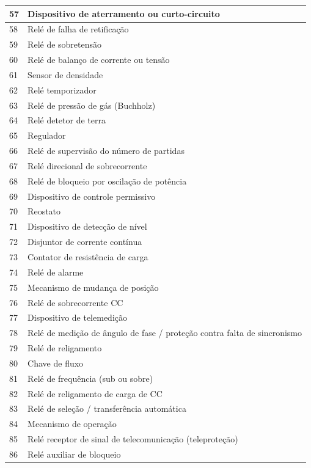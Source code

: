 \documentclass[a5paper,english,spanish,brazil]{ufsc-thesis}
\begin{document}
\begin{longtable}{|l|p{}|}
  57 & Dispositivo de aterramento ou curto-circuito \\ \hline
  58 & Relé de falha de retificação \\ \hline
  59 & Relé de sobretensão \\ \hline
  60 & Relé de balanço de corrente ou tensão \\ \hline
  61 & Sensor de densidade \\ \hline
  62 & Relé temporizador \\ \hline
  63 & Relé de pressão de gás (Buchholz) \\ \hline
  64 & Relé detetor de terra \\ \hline
  65 & Regulador \\ \hline
  66 & Relé de supervisão do número de partidas  \\ \hline
  67 & Relé direcional de sobrecorrente  \\ \hline
  68 & Relé de bloqueio por oscilação de potência \\ \hline
  69 & Dispositivo de controle permissivo \\ \hline
  70 & Reostato  \\ \hline
  71 & Dispositivo de detecção de nível \\ \hline
  72 & Disjuntor de corrente contínua \\ \hline
  73 & Contator de resistência de carga \\ \hline
  74 & Relé de alarme \\ \hline
  75 & Mecanismo de mudança de posição \\ \hline
  76 & Relé de sobrecorrente CC \\ \hline
  77 & Dispositivo de telemedição \\ \hline
  78 & Relé de medição de ângulo de fase / proteção contra falta de sincronismo \\ \hline
  79 & Relé de religamento \\ \hline
  80 & Chave de fluxo \\ \hline
  81 & Relé de frequência (sub ou sobre) \\ \hline
  82 & Relé de religamento de carga de CC \\ \hline
  83 & Relé de seleção / transferência automática \\ \hline
  84 & Mecanismo de operação \\ \hline
  85 & Relé receptor de sinal de telecomunicação (teleproteção) \\ \hline
  86 & Relé auxiliar de bloqueio \\ \hline

\end{longtable}
\end{document}
